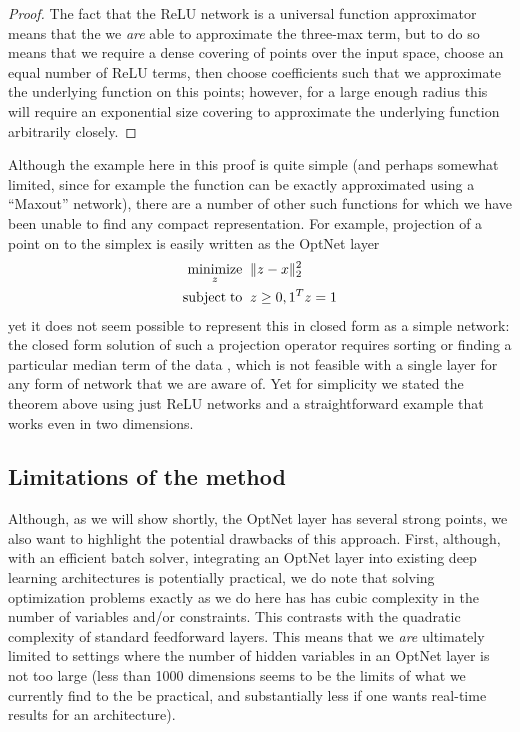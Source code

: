 \begin{proof}
    The fact that the ReLU network is a universal function approximator means that
    the we \emph{are} able to approximate the three-max term, but to do so means
    that we require a dense covering of points over the input space, choose an equal
    number of ReLU terms, then choose coefficients such that we approximate the
    underlying function on this points; however, for a large enough radius this will
    require an exponential size covering to approximate the underlying function
    arbitrarily closely.
\end{proof}

Although the example here in this proof is quite simple (and perhaps somewhat
limited, since for example the function can be exactly approximated using a
``Maxout'' network), there are a number of other such functions for which we
have been unable to find any compact representation.  For example, projection of
a point on to the simplex is easily written as the OptNet layer
\begin{equation}
    \begin{split}
        \operatorname*{minimize}_{z} \;\; & \|z - x\|_2^2 \\
        \operatorname*{subject\;to} \;\; & z \geq 0, 1^T z = 1
    \end{split}
\end{equation}
yet it does not seem possible to represent this in closed form as a simple
network: the closed form solution of such a projection operator requires sorting
or finding a particular median term of the data \cite{duchi2008efficient}, which
is not feasible
with a single layer for any form of network that we are aware of.  Yet for
simplicity we stated the theorem above using just ReLU networks and a
straightforward example that works even in two dimensions.

\subsection{Limitations of the method}
Although, as we will show shortly, the OptNet layer has several strong points,
we also want to highlight the potential drawbacks of this approach.
First, although, with an efficient batch solver, integrating an OptNet layer into
existing deep learning architectures is potentially practical, we do note that
solving optimization problems exactly as we do here has has cubic complexity in
the number of variables and/or constraints.  This contrasts with the quadratic
complexity of standard feedforward layers.  This means that we \emph{are}
ultimately limited to settings where the number of hidden variables in an OptNet
layer is not too large (less than 1000 dimensions seems to be the limits of what
we currently find to the be practical, and substantially less if one wants
real-time results for an architecture).

